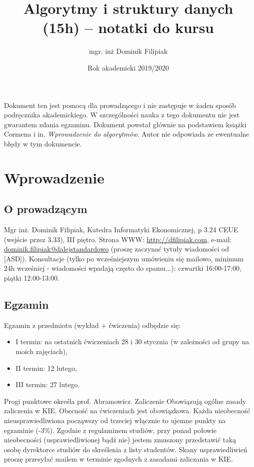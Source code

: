 \documentclass[10pt, oneside]{article}
\title{Algorytmy i struktury danych (15h) -- notatki do kursu}
\author{mgr. inż Dominik Filipiak}
\date{Rok akademicki 2019/2020}
\theoremstyle{remark}
\begin{document}
\maketitle
\tableofcontents

\vspace{.25in}

Dokument ten jest pomocą dla prowadzącego i nie zastępuje w żaden sposób podręcznika akademickiego.
W szczególności nauka z tego dokumentu nie jest gwarantem zdania egzaminu.
Dokument powstał głównie na podstawiem książki Cormena i in. \emph{Wprowadzenie do algorytmów}.
Autor nie odpowiada ze ewentualne błędy w tym dokumencie.

\section{Wprowadzenie}

\subsection{O prowadzącym}
Mgr inż. Dominik Filipiak, Katedra Informatyki Ekonomicznej, p 3.24 CEUE (wejście przez 3.33), III piętro.
Strona WWW: \url{http://dfilipiak.com}, e-mail: \url{dominik.filipiak@dalejstandardowo} (proszę zaczynać tytuły wiadomości od [ASD]).
Konsultacje (tylko po wcześniejszym umówieniu się mailowo, minimum 24h wcześniej - wiadomości wpadają często do spamu...): czwartki 16:00-17:00, piątki 12:00-13:00.

\subsection{Egzamin}
Egzamin z przedmiotu (wykład + ćwiczenia) odbędzie się:
\begin{itemize}
	\item I termin: na ostatnich ćwiczeniach 28 i 30 stycznia (w zależności od grupy na moich zajęciach),
	\item II termin: 12 lutego,
	\item III termin: 27 lutego.
\end{itemize}
Progi punktowe określa prof. Abramowicz.
Zaliczenie
Obowiązują ogólne zasady zaliczenia w KIE. Obecność na ćwiczeniach jest obowiązkowa. Każda nieobecność nieusprawiedliwiona począwszy od trzeciej włącznie to ujemne punkty na egzaminie (-3\%).
Zgodnie z regulaminem studiów, przy ponad połowie nieobecności (usprawiedliwionej bądź nie) jestem zmuszony przedstawić taką osobę dyrektorce studiów do skreślenia z listy studentów. Skany usprawiedliwień proszę przesyłać mailem w terminie zgodnych z zasadami zaliczania w KIE.
\end{document}

